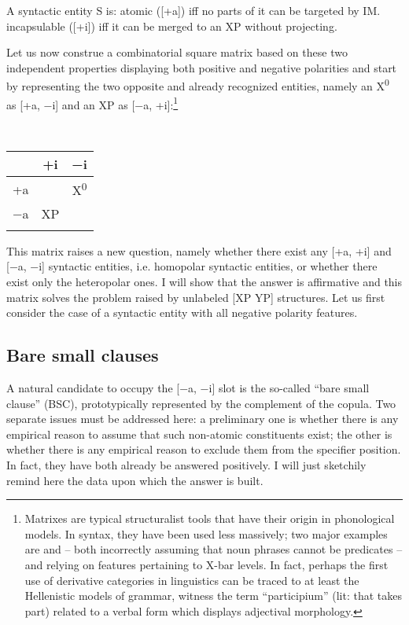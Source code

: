\documentclass[output=paper]{langsci/langscibook}
\begin{document}
\ea A syntactic entity S is:
\label{ex:key:28.1}
	\ea atomic ([+a]) iff no parts of it can be targeted by \gls{IM}.
	\ex incapsulable ([+i]) iff it can be merged to an XP without projecting.
	\z
\z

Let us now construe a combinatorial square matrix based on these two
independent properties displaying both positive and negative polarities and
start by representing the two opposite and already recognized entities, namely
an X\textsuperscript{0} as [+a, −i] and  an XP as [−a, +i]:\footnote{Matrixes
    are typical structuralist tools that have their origin in phonological
    models.  In syntax, they have been used less massively; two major examples
    are  and \citet{Jackendoff1977} -- both incorrectly
    assuming that noun phrases cannot be predicates -- and
    \citealt{MuyskenvanRiemsdijk1986} relying on features pertaining to X-bar
    levels. In fact, perhaps the first use of derivative categories in
    linguistics can be traced to at least the Hellenistic models of grammar,
witness the term “participium” (lit: that takes part) related to a verbal form
which displays adjectival morphology.}

\ea\label{ex:key:28.2}\leavevmode\\[-1\baselineskip]
    \begin{tabular}{ccc}
    \lsptoprule
    	        & +i & −i\\
    \midrule
    +a &             & X\textsuperscript{0}\\
    −a & XP          & \\
    \lspbottomrule
    \end{tabular}
\z

This matrix raises a new question, namely whether there exist any [+a, +i] and
[−a, −i] syntactic entities, i.e. homopolar syntactic entities, or whether
there exist only the heteropolar ones. I will show that the answer is
affirmative and this matrix solves the problem raised by unlabeled [XP YP]
structures.  Let us first consider the case of a syntactic entity with all
negative polarity features.

\subsection{Bare small clauses}

A natural candidate to occupy the [−a, −i] slot is the so-called “bare small
clause” (\gls{BSC}), prototypically represented by the complement
of the copula. Two separate issues must be addressed here: a preliminary one is
whether there is any empirical reason to assume that such non-atomic
constituents exist; the other is whether there is any empirical reason to
exclude them from the specifier position. In fact, they have both already be
answered positively.  I will just sketchily remind here the data upon which the
answer is built.\largerpage
\end{document}
